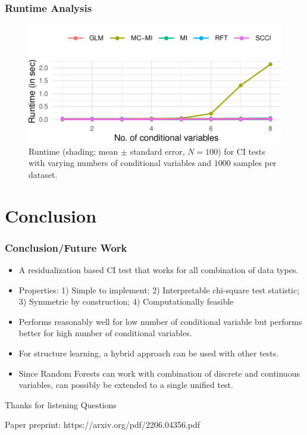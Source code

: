 \documentclass{beamer}
\begin{document}
\begin{frame}
	\frametitle{Runtime Analysis}
	\begin{figure}
		\centering
		\includegraphics{imgs/runtime.pdf}
		\caption*{Runtime (shading: mean $\pm$ standard error, $N=100$)
		for CI tests with varying numbers of conditional variables and
		$1000$ samples per dataset.
		}
	\end{figure}
\end{frame}

\section{Conclusion}
\begin{frame}
	\frametitle{Conclusion/Future Work}
	\begin{itemize}
		\setlength\itemsep{1em}
		\item A residualization based CI test that works for all combination of data types.
		\item Properties: 1) Simple to implement; 2) Interpretable chi-square test statistic; 3) Symmetric by construction; 4) Computationally feasible
		\item Performs reasonably well for low number of
			conditional variable but performs better for high
			number of conditional variables.
		\item For structure learning, a hybrid approach can be used with other
			tests.
		\item Since Random Forests can work with combination of discrete and 
			continuous variables, can possibly be extended to a single 
			unified test.
	\end{itemize}
\end{frame}

\begin{frame}
	\begin{center}
		\Huge{Thanks for listening} \newline
		\Huge{Questions}
	\end{center}
	\begin{center}
		Paper preprint: https://arxiv.org/pdf/2206.04356.pdf
	\end{center}
\end{frame}
\end{document}
